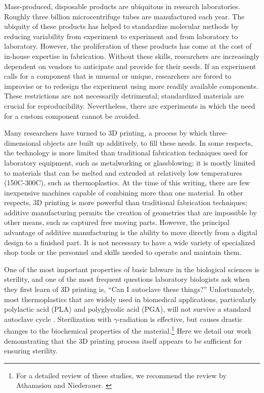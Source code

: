 \begin{refsection}
Mass-produced, disposable products are ubiquitous in research
laboratories.  Roughly three billion microcentrifuge tubes are
manufactured each year. \cite{eppy} The ubiquity of these products has
helped to standardize molecular methods by reducing variability from
experiment to experiment and from laboratory to laboratory. However,
the proliferation of these products has come at the cost of in-house
expertise in fabrication. Without these skills, researchers are
increasingly dependent on vendors to anticipate and provide for their
needs. If an experiment calls for a component that is unusual or
unique, researchers are forced to improvise or to redesign the
experiment using more readily available components. These restrictions
are not necessarily detrimental; standardized materials are crucial
for reproducibility. Nevertheless, there are experiments in which the
need for a custom component cannot be avoided.

Many researchers have turned to 3D printing, a process by which three-
dimensional objects are built up additively, to fill these needs. In
some respects, the technology is more limited than traditional
fabrication techniques used for laboratory equipment, such as
metalworking or glassblowing; it is mostly limited to materials that
can be melted and extruded at relatively low temperatures (150C-300C),
such as thermoplastics.  At the time of this writing, there are few
inexpensive machines capable of combining more than one material. In
other respects, 3D printing is more powerful than traditional
fabrication techniques; additive manufacturing permits the creation of
geometries that are impossible by other means, such as captured free
moving parts. However, the principal advantage of additive
manufacturing is the ability to move directly from a digital design to
a finished part. It is not necessary to have a wide variety of
specialized shop tools or the personnel and skills needed to operate
and maintain them.

One of the most important properties of basic labware in the
biological sciences is sterility, and one of the most frequent
questions laboratory biologists ask when they first learn of 3D
printing is, ``Can I autoclave these things?'' Unfortunately, most
thermoplastics that are widely used in biomedical applications,
particularly polylactic acid (PLA) and polyglycolic acid (PGA), will
not survive a standard autoclave cycle
\cite{steam_sterilization_PLA}. Sterilization with $\gamma$-radiation
is effective, but causes drastic changes to the biochemical properties
of the material.\footnote{For a detailed review of these studies, we
  recommend the review by Athanasiou and
  Niederauer. \cite{pla_suture_review}} \cite{gama_radiation_PLA} Here
we detail our work demonstrating that the 3D printing process itself
appears to be sufficient for ensuring sterility.


\end{refsection}

